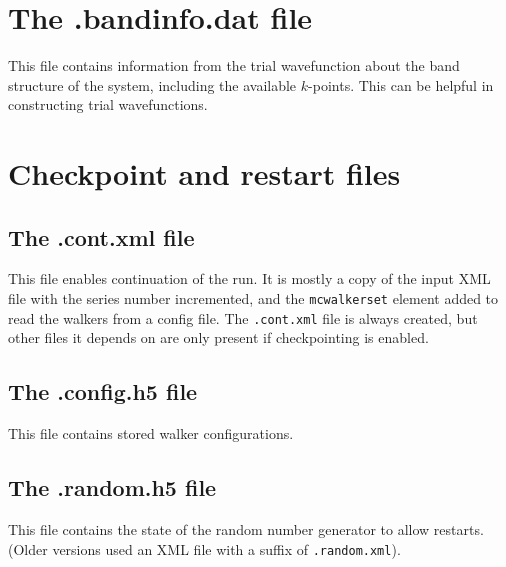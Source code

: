 \section{The .bandinfo.dat file}
\label{sec:bandinfo_file}
This file contains information from the trial wavefunction about the band structure of the system,
including the available $k$-points. This can
be helpful in constructing trial wavefunctions.


\section{Checkpoint and restart files}
\label{sec:checkpoint_files}
\subsection{The .cont.xml file}
This file enables continuation of the run.  It is mostly a copy of the input XML file with the series number incremented, and the \texttt{mcwalkerset} element added to read the walkers from a config file.   The \texttt{.cont.xml} file is always created, but other files it depends on are only present if checkpointing is enabled.

\subsection{The .config.h5 file}
This file contains stored walker configurations.

\subsection{The .random.h5 file}
This file contains the state of the random number generator to allow restarts.
(Older versions used an XML file with a suffix of \texttt{.random.xml}).

